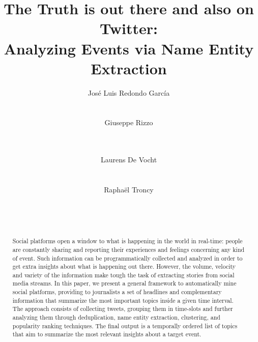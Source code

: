 \documentclass{sig-alternate}
\begin{document}
\title{The Truth is out there and also on Twitter: \\ Analyzing Events via Name Entity Extraction}

\author{
\alignauthor Jos\'e Luis Redondo Garc\'ia\\
	\\
	\\
\alignauthor Giuseppe Rizzo\\
	\\
	\\
\and
\alignauthor Laurens De Vocht\\
    \\
    \\
\alignauthor Rapha\"el Troncy\\
	\\
	\\
		\\
}

\maketitle


\begin{abstract}

Social platforms open a window to what is happening in the world in real-time: people are constantly sharing and reporting their experiences and feelings concerning any kind of event. Such information can be programmatically collected and analyzed in order to get extra insights about what is happening out there. However, the volume, velocity and variety of the information make tough the task of extracting stories from social media streams. In this paper, we present a general framework to automatically mine social platforms, providing to journalists a set of headlines and complementary information that summarize the most important topics inside a given time interval. The approach consists of collecting tweets, grouping them in time-slots and further analyzing them through deduplication, name entity extraction, clustering, and popularity ranking techniques. The final output is a temporally ordered list of topics that aim to summarize the most relevant insights about a target event. 

\end{abstract}
\end{document}

